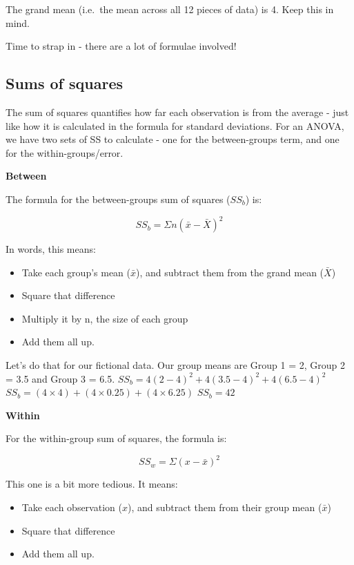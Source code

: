 \documentclass[
]{book}
\providecommand{\tightlist}{%
  \setlength{\itemsep}{0pt}\setlength{\parskip}{0pt}}
\begin{document}
The grand mean (i.e.~the mean across all 12 pieces of data) is 4. Keep
this in mind.

Time to strap in - there are a lot of formulae involved!

\hypertarget{sums-of-squares}{%
\subsection{Sums of squares}\label{sums-of-squares}}

The sum of squares quantifies how far each observation is from the
average - just like how it is calculated in the formula for standard
deviations. For an ANOVA, we have two sets of SS to calculate - one for
the between-groups term, and one for the within-groups/error.

\textbf{Between}

The formula for the between-groups sum of squares (\(SS_b\)) is:

\[
SS_b = \Sigma n(\bar x - \bar X)^2
\]

In words, this means:

\begin{itemize}
\tightlist
\item
  Take each group's mean (\(\bar x\)), and subtract them from the grand
  mean (\(\bar X\))
\item
  Square that difference
\item
  Multiply it by n, the size of each group
\item
  Add them all up.
\end{itemize}

Let's do that for our fictional data. Our group means are Group 1 = 2,
Group 2 = 3.5 and Group 3 = 6.5.
\(SS_b = 4(2-4)^2 + 4(3.5-4)^2 + 4(6.5-4)^2\)
\(SS_b = (4 \times 4) + (4 \times 0.25) + (4 \times 6.25)\) \(SS_b = 42\)

\textbf{Within}

For the within-group sum of squares, the formula is:

\[
SS_w = \Sigma (x - \bar x)^2
\]

This one is a bit more tedious. It means:

\begin{itemize}
\tightlist
\item
  Take each observation (\(x\)), and subtract them from their group mean
  (\(\bar x\))
\item
  Square that difference
\item
  Add them all up.
\end{itemize}
\end{document}

